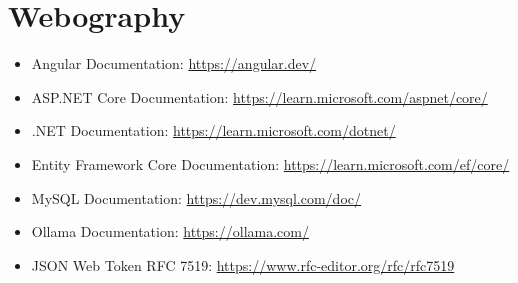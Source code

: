 \chapter*{Webography}
{}

\begin{itemize}
    \item Angular Documentation: \url{https://angular.dev/}
    \item ASP.NET Core Documentation: \url{https://learn.microsoft.com/aspnet/core/}
    \item .NET Documentation: \url{https://learn.microsoft.com/dotnet/}
    \item Entity Framework Core Documentation: \url{https://learn.microsoft.com/ef/core/}
    \item MySQL Documentation: \url{https://dev.mysql.com/doc/}
    \item Ollama Documentation: \url{https://ollama.com/}
    \item JSON Web Token RFC 7519: \url{https://www.rfc-editor.org/rfc/rfc7519}
\end{itemize}
